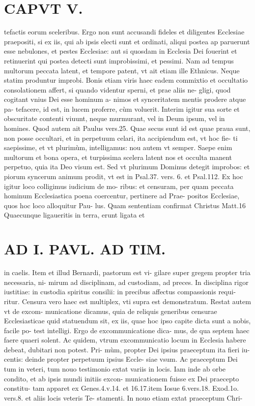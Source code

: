 \documentclass{article}
\begin{document}
\begin{pages}
\section*{CAPVT  V. }
\marginpar{[ p.387 ]}\pstart tefactis eorum sceleribus. Ergo non sunt accusandi fideles et diligentes Ecclesiae praepositi, si ex iis, qui ab ipsis electi sunt et ordinati, aliqui postea ap paruerunt esse nebulones, et pestes Ecclesiae: aut si quosdam in Ecclesia Dei fouerint et retinuerint qui postea detecti sunt improbissimi, et pessimi. Nam ad tempus multorum peccata latent, et tempore patent, vt ait etiam ille Ethnicus. Neque  statim produntur improbi. Bonis etiam viris haec eadem commixtio et occultatio consolationem affert, si quando videntur sperni, et prae aliis ne- gligi, quod cogitant vnius Dei esse hominum a- nimos et synceritatem mentis prodere atque  pa- tefacere, id est, in lucem proferre, cùm voluerit. Interim igitur sua sorte et obscuritate contenti viuunt, neque murmurant, vel in Deum ipsum, vel in homines.  \pend\pstart Quod autem ait Paulus vers.25. Quae secus sunt id est quae praua sunt, non posse occultari, et in perpetuum celari, ita accipiendum est, vt hoc fie- ti saepissime, et vt plurimùm, intelligamus: nou autem vt semper. Saepe enim multorum et bona opera, et turpissima scelera latent nos et occulta manent perpetuo, quia ita Deo visum est. Sed vt plurimum Dominus detegit improbos: et piorum syncerum animum prodit, vt est in Psal.37. vers. 6. et Psal.112.  \pend\pstart Ex hoc igitur loco colligimus iudicium de mo- ribus: et censuram, per quam peccata hominum Ecclesiastica poena coercentur, pertinere ad Prae- positos Ecclesiae, quos hoc loco alloquitur Pau- lus. Quam sententiam confirmat Christus Matt.16 Quaecunque ligaueritis in terra, erunt ligata et  \pend
\section*{AD I. PAVL. AD TIM. }
\marginpar{[ p.388 ]}\pstart in caelis. Item et illud Bernardi, pastorum est vi- gilare super gregem propter tria necessaria, ni- mirum ad disciplinam, ad custodiam, ad preces. In disciplina rigor iustitiae: in custodia spiritus consilii: in precibus affectus compassionis requi- ritur. Censura vero haec est multiplex, vti supra est demonstratum. Restat autem vt de excom- municatione dicamus, quia de reliquis generibus censurae Ecclesiasticae quid statuendum sit, ex iis, quae hoc ipso capite dicta sunt a nobis, facile po- test intelligi. Ergo de excommunicatione dica- mus, de qua septem haec faere quaeri solent.  \pend\pstart Ac quidem, vtrum excommunicatio locum in Ecclesia habere debeat, dubitari non potest. Pri- mùm, propter Dei ipsius praeceptum ita fieri iu- centis: deinde propter perpetuum ipsius Eccle- siae vsum. Ac praeceptum Dei tum in veteri, tum nouo testimonio extat variis in locis. Iam inde ab orbe condito, et ab ipsis mundi initiis excon- municationem fuisse ex Dei praecepto constitu- tam apparet ex Genes.4.v.14. et 16.17.item Iosue 6.vers.18. Exod.1o. vers.8. et aliis locis veteris Te- stamenti. In nouo etiam extat praeceptum Chri-  \pend

\end{pages}
\end{document}
